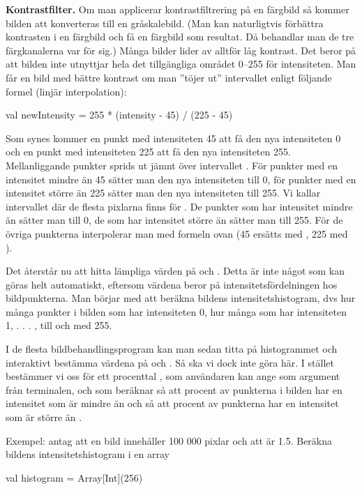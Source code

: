 \Task \textbf{Kontrastfilter.} Om man applicerar kontrastfiltrering på en färgbild så kommer bilden att konverteras till en gråskalebild. (Man kan naturligtvis förbättra kontrasten i en färgbild och få en färgbild som resultat. Då behandlar man de tre färgkanalerna var för sig.) Många bilder lider av alltför låg kontrast. Det beror på att bilden inte utnyttjar hela det tillgängliga området 0–255 för intensiteten. Man får en bild med bättre kontrast om man ''töjer ut'' intervallet enligt följande formel (linjär interpolation):

\begin{Code}
val newIntensity = 255 * (intensity - 45) / (225 - 45)
\end{Code}

Som synes kommer en punkt med intensiteten 45 att få den nya intensiteten 0 och en punkt med intensiteten 225 att få den nya intensiteten 255. Mellanliggande punkter sprids ut jämnt över intervallet \code{[0, 255]}. För punkter med en intensitet mindre än 45 sätter man den nya intensiteten till 0, för punkter med en intensitet större än 225 sätter man den nya intensiteten till 255. Vi kallar intervallet där de flesta pixlarna finns för . De punkter som har intensitet mindre än  sätter man till 0, de som har intensitet större än  sätter man till 255. För de övriga punkterna interpolerar man med formeln ovan (45 ersätts med , 225 med ).

Det återstår nu att hitta lämpliga värden på  och . Detta är inte något som kan göras helt automatiskt, eftersom värdena beror på intensitetsfördelningen hos bildpunkterna. Man börjar med att beräkna bildens intensitetshistogram, dvs hur många punkter i bilden som har intensiteten 0, hur många som har intensiteten 1, . . . , till och med 255.

I de flesta bildbehandlingsprogram kan man sedan titta på histogrammet och interaktivt bestämma värdena på  och . Så ska vi dock inte göra här. I stället bestämmer vi oss för ett procenttal , som användaren kan ange som argument från terminalen, och som  beräknar  så att  procent av punkterna i bilden har en intensitet som är mindre än  och  så att  procent av punkterna har en intensitet som är större än .

Exempel: antag att en bild innehåller 100 000 pixlar och att  är 1.5. Beräkna bildens intensitetshistogram i en array
\begin{Code}
val histogram = Array[Int](256)
\end{Code}

